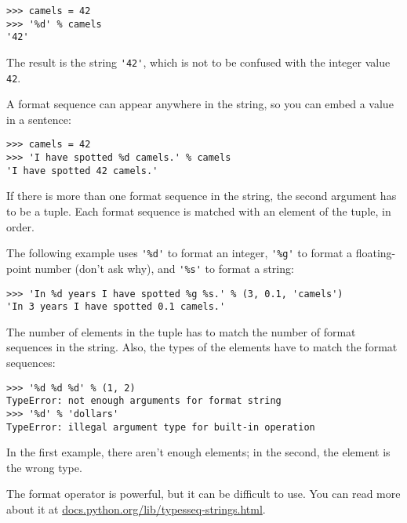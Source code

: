 \beforeverb
\begin{verbatim}
>>> camels = 42
>>> '%d' % camels
'42'
\end{verbatim}
\afterverb
%
The result is the string \verb"'42'", which is not to be confused
with the integer value {\tt 42}.

A format sequence can appear anywhere in the string,
so you can embed a value in a sentence:

\beforeverb
\begin{verbatim}
>>> camels = 42
>>> 'I have spotted %d camels.' % camels
'I have spotted 42 camels.'
\end{verbatim}
\afterverb
%
If there is more than one format sequence in the string,
the second argument has to be a tuple.  Each format sequence is
matched with an element of the tuple, in order.

The following example uses \verb"'%d'" to format an integer,
\verb"'%g'" to format
a floating-point number (don't ask why), and \verb"'%s'" to format
a string:

\beforeverb
\begin{verbatim}
>>> 'In %d years I have spotted %g %s.' % (3, 0.1, 'camels')
'In 3 years I have spotted 0.1 camels.'
\end{verbatim}
\afterverb
%
The number of elements in the tuple has to match the number
of format sequences in the string.  Also, the types of the
elements have to match the format sequences:


\beforeverb
\begin{verbatim}
>>> '%d %d %d' % (1, 2)
TypeError: not enough arguments for format string
>>> '%d' % 'dollars'
TypeError: illegal argument type for built-in operation
\end{verbatim}
\afterverb
%
In the first example, there aren't enough elements; in the
second, the element is the wrong type.

The format operator is powerful, but it can be difficult to use.  You
can read more about it at
\url{docs.python.org/lib/typesseq-strings.html}.




